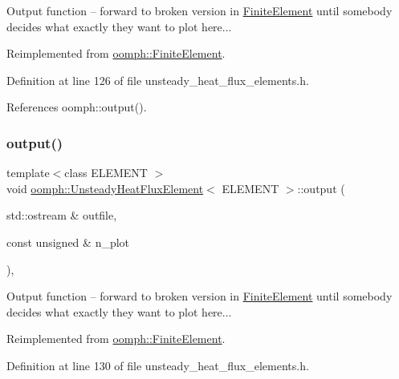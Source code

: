Output function -- forward to broken version in \hyperlink{classoomph_1_1FiniteElement}{Finite\+Element} until somebody decides what exactly they want to plot here... 

Reimplemented from \hyperlink{classoomph_1_1FiniteElement_a2ad98a3d2ef4999f1bef62c0ff13f2a7}{oomph\+::\+Finite\+Element}.



Definition at line 126 of file unsteady\+\_\+heat\+\_\+flux\+\_\+elements.\+h.



References oomph\+::output().

\mbox{\label{classoomph_1_1UnsteadyHeatFluxElement_ae3bc4021112b2fff59ae1d34ea1f7364}} 
\subsubsection{\texorpdfstring{output()}{output()}\hspace{0.1cm}{\footnotesize\ttfamily [2/4]}}
{\footnotesize\ttfamily template$<$class E\+L\+E\+M\+E\+NT $>$ \\
void \hyperlink{classoomph_1_1UnsteadyHeatFluxElement}{oomph\+::\+Unsteady\+Heat\+Flux\+Element}$<$ E\+L\+E\+M\+E\+NT $>$\+::output (\begin{DoxyParamCaption}\item[{std\+::ostream \&}]{outfile,  }\item[{const unsigned \&}]{n\+\_\+plot }\end{DoxyParamCaption})\hspace{0.3cm}{\ttfamily [inline]}, {\ttfamily [virtual]}}



Output function -- forward to broken version in \hyperlink{classoomph_1_1FiniteElement}{Finite\+Element} until somebody decides what exactly they want to plot here... 



Reimplemented from \hyperlink{classoomph_1_1FiniteElement_afa9d9b2670f999b43e6679c9dd28c457}{oomph\+::\+Finite\+Element}.



Definition at line 130 of file unsteady\+\_\+heat\+\_\+flux\+\_\+elements.\+h.



